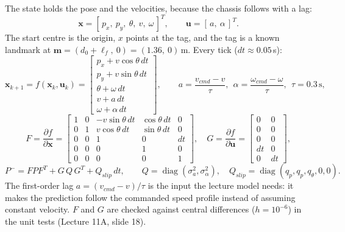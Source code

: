 The state holds the pose and the velocities, because the chassis follows  with a lag:
\begin{equation}
  \mathbf x = [\,p_x,\ p_y,\ \theta,\ v,\ \omega\,]^T,\qquad \mathbf u=[\,a,\ \alpha\,]^T .
\end{equation}
The start centre is the origin, $x$ points at the tag, and the tag is a known landmark at
$\mathbf m = (d_0+\ell_f,\ 0) = (1.36,\ 0)$\,m. Every tick ($dt\approx0.05$\,s):
\begin{equation}
\mathbf x_{k+1} = f(\mathbf x_k,\mathbf u_k) =
\begin{bmatrix} p_x + v\cos\theta\,dt\\ p_y + v\sin\theta\,dt\\ \theta+\omega\,dt\\ v + a\,dt\\ \omega+\alpha\,dt\end{bmatrix},
\qquad
a = \frac{v_{cmd}-v}{\tau},\ \ \alpha = \frac{\omega_{cmd}-\omega}{\tau},\ \ \tau = 0.3\,\text{s},
\end{equation}
\begin{equation}
F=\frac{\partial f}{\partial \mathbf x}=
\begin{bmatrix}1&0&-v\sin\theta\,dt&\cos\theta\,dt&0\\0&1&v\cos\theta\,dt&\sin\theta\,dt&0\\0&0&1&0&dt\\0&0&0&1&0\\0&0&0&0&1\end{bmatrix},
\quad
G=\frac{\partial f}{\partial \mathbf u}=\begin{bmatrix}0&0\\0&0\\0&0\\dt&0\\0&dt\end{bmatrix},
\end{equation}
\begin{equation}
P^- = F P F^T + G\,Q\,G^T + Q_{slip}\,dt,\qquad Q=\operatorname{diag}(\sigma_a^2,\sigma_\alpha^2),\quad
Q_{slip}=\operatorname{diag}(q_p,q_p,q_\theta,0,0).
\end{equation}
The first-order lag $a=(v_{cmd}-v)/\tau$ is the input the lecture model needs: it makes the prediction follow the
commanded speed profile instead of assuming constant velocity. $F$ and $G$ are checked against central differences
($h=10^{-6}$) in the unit tests (Lecture 11A, slide 18).

